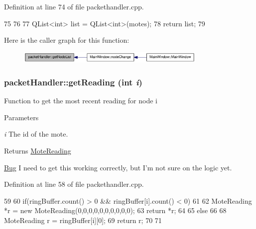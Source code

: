 Definition at line 74 of file packethandler.cpp.




\begin{DoxyCode}
75 {
76 
77     QList<int> list = QList<int>(motes);
78     return list;
79 }
\end{DoxyCode}




Here is the caller graph for this function:\nopagebreak
\begin{figure}[H]
\begin{center}
\leavevmode
\includegraphics[width=258pt]{classpacketHandler_a7d07166d577b014234ad311599ac3291_icgraph}
\end{center}
\end{figure}


\hypertarget{classpacketHandler_aec6fa94602daa18227491b76001152cb}{
\subsubsection[{getReading}]{ packetHandler::getReading (int {\em i})}}
\label{classpacketHandler_aec6fa94602daa18227491b76001152cb}
Function to get the most recent reading for node i 
\begin{DoxyParams}{Parameters}
\item[{\em i}]The id of the mote. \end{DoxyParams}
\begin{DoxyReturn}{Returns}
\hyperlink{classMoteReading}{MoteReading} 
\end{DoxyReturn}


\begin{Desc}
\item[\hyperlink{bug__bug000001}{Bug}]I need to get this working correctly, but I'm not sure on the logic yet. \end{Desc}




Definition at line 58 of file packethandler.cpp.




\begin{DoxyCode}
59 {
60         if(ringBuffer.count() > 0 && ringBuffer[i].count() < 0)
61     {
62         MoteReading *r = new MoteReading(0,0,0,0,0,0,0,0,0,0);
63         return *r;
64     }
65     else
66     {
68         MoteReading r = ringBuffer[i][0];
69     return r;
70     }
71 }
\end{DoxyCode}




